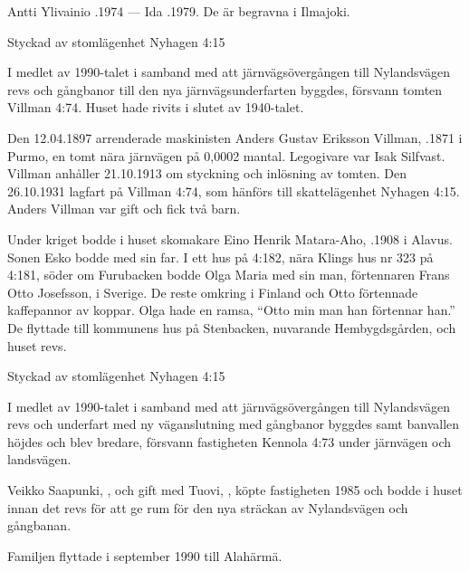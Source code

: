 Antti Ylivainio .1974  ---  Ida .1979. De är begravna i Ilmajoki.



Styckad av stomlägenhet Nyhagen 4:15

I medlet av 1990-talet i samband med att järnvägsövergången till Nylandsvägen revs och gångbanor till den nya järnvägsunderfarten	byggdes, försvann tomten Villman 4:74. Huset hade rivits i slutet av 1940-talet.


Den 12.04.1897 arrenderade maskinisten Anders Gustav Eriksson Villman, .1871 i Purmo, en tomt nära järnvägen på 0,0002	mantal. Legogivare var Isak Silfvast. Villman anhåller 21.10.1913 om styckning och inlösning av tomten. Den 26.10.1931 lagfart på Villman	4:74, som hänförs till skattelägenhet Nyhagen 4:15. Anders Villman var gift och fick två barn.
\begin{jhchildren}
  \item {}
  \item {}
\end{jhchildren}
Under kriget bodde i huset skomakare Eino Henrik Matara-Aho, .1908 i Alavus. Sonen Esko bodde med sin far. I ett hus på 4:182, nära Klings hus nr 323 på 4:181, söder om Furubacken bodde Olga Maria med sin man, förtennaren Frans Otto Josefsson,  i Sverige. De reste omkring i Finland och Otto förtennade kaffepannor av koppar. Olga hade en ramsa, ``Otto min man han förtennar han.'' De flyttade till kommunens hus på Stenbacken, nuvarande Hembygdsgården, och huset revs.



Styckad av stomlägenhet Nyhagen 4:15


I medlet av 1990-talet i samband med att järnvägsövergången till Nylandsvägen revs och underfart med ny väganslutning med gångbanor byggdes samt banvallen höjdes och blev bredare, försvann fastigheten Kennola 4:73 under järnvägen och landsvägen.


Veikko Saapunki, , och gift med Tuovi, , köpte fastigheten 1985 och bodde i huset innan det revs för att ge rum för den nya sträckan av Nylandsvägen och gångbanan.
\begin{jhchildren}
  \item {}
  \item {}
\end{jhchildren}
Familjen flyttade i september 1990 till Alahärmä.


